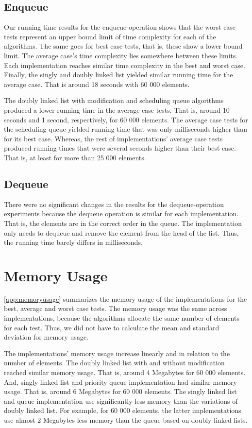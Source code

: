 \documentclass[a4paper,11pt]{kth-mag}
\newcommand*{\skippara}{\par\vspace{\baselineskip} \noindent}
\begin{document}
\subsection{Enqueue}
Our running time results for the enqueue-operation shows that the worst case tests represent an upper bound limit of time complexity for each of the algorithms.
The same goes for best case tests, that is, these show a lower bound limit.
The average case's time complexity lies somewhere between these limits.
Each implementation reaches similar time complexity in the best and worst case.
Finally, the singly and doubly linked list yielded similar running time for the average case.
That is around 18 seconds with 60 000 elements.

\skippara The doubly linked list with modification and scheduling queue algorithms produced a lower running time in the average case tests.
That is, around 10 seconds and 1 second, respectively, for 60 000 elements.
The average case tests for the scheduling queue yielded running time that was only milliseconds higher than for its best case.
Whereas, the rest of implementations' average case tests produced running times that were several seconds higher than their best case.
That is, at least for more than 25 000 elements.

\subsection{Dequeue}
There were no significant changes in the results for the dequeue-operation experiments because the dequeue operation is similar for each implementation.
That is, the elements are in the correct order in the queue.
The implementation only needs to dequeue and remove the element from the head of the list.
Thus, the running time barely differs in milliseconds.

\section{Memory Usage}
\cref{app:memoryusage} summarizes the memory usage of the implementations for the best, average and worst case tests.
The memory usage was the same across implementations, because the algorithms allocate the same number of elements for each test.
Thus, we did not have to calculate the mean and standard deviation for memory usage.

\skippara The implementations' memory usage increase linearly and in relation to the number of elements.
The doubly linked list with and without modification reached similar memory usage.
That is, around 4 Megabytes for 60 000 elements.
And, singly linked list and priority queue implementation had similar memory usage.
That is, around 6 Megabytes for 60 000 elements.
The singly linked list and queue implementation use significantly less memory than the variations of doubly linked list.
For example, for 60 000 elements, the latter implementations use almost 2 Megabytes less memory than the queue based on doubly linked lists.
\end{document}
